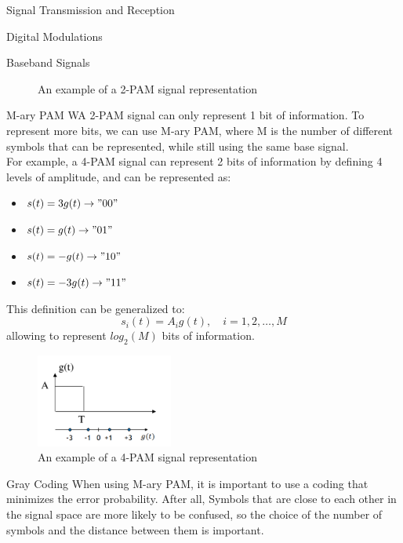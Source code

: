 \begin{section}{Signal Transmission and Reception}
\begin{subsection}{Digital Modulations}
\begin{subsubsection}{Baseband Signals}
\begin{figure}[h]
        \caption{An example of a 2-PAM signal representation}
        \label{fig:PAM}
      \end{figure}
    \end{subsubsection}
    \begin{subsubsection}{M-ary PAM}
      WA 2-PAM signal can only represent 1 bit of information. To represent more bits, we can use
      M-ary PAM, where M is the number of different symbols that can be represented, while still
      using the same base signal.\\
      For example, a 4-PAM signal can represent 2 bits of information by defining 4 levels of
      amplitude, and can be represented as:
      \begin{itemize}
        \item $s(t)=3g(t) \to "00"$
        \item $s(t)=g(t) \to "01"$
        \item $s(t)=-g(t) \to "10"$
        \item $s(t)=-3g(t) \to "11"$
      \end{itemize}
      This definition can be generalized to:
      \begin{equation}
        s_i(t)=A_i g(t),\quad i=1,2,\dots,M
      \end{equation}
      allowing to represent $log_2(M)$ bits of information.\\
      \begin{figure}[h]
        \centering
        \includegraphics[width=0.4\textwidth]{img/M-PAM.png}
        \caption{An example of a 4-PAM signal representation}
        \label{fig:4-PAM}
      \end{figure}
    \end{subsubsection}
    \begin{subsubsection}{Gray Coding}
      When using M-ary PAM, it is important to use a coding that minimizes the error probability.
      After all, Symbols that are close to each other in the signal space are more likely to be 
      confused, so the choice of the number of symbols and the distance between them is 
      important.\\

\end{subsubsection}
\end{subsection}
\end{section}
